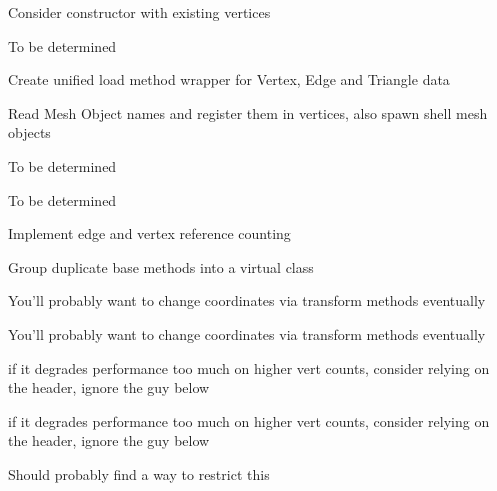 
\begin{DoxyRefList}
\item[\label{todo__todo000002}%
\hypertarget{todo__todo000002}{}%
Namespace \hyperlink{namespace_core}{Core} ]Consider constructor with existing vertices 

To be determined 

Create unified load method wrapper for Vertex, Edge and Triangle data 

Read Mesh Object names and register them in vertices, also spawn shell mesh objects 

\begin{DoxyVerb}\end{DoxyVerb}




To be determined 

To be determined 

Implement edge and vertex reference counting 

Group duplicate base methods into a virtual class 

You'll probably want to change coordinates via transform methods eventually 

You'll probably want to change coordinates via transform methods eventually  
\item[\label{todo__todo000006}%
\hypertarget{todo__todo000006}{}%
Member \hyperlink{class_core_1_1_i_o_1_1_model_file_abd7e3094112324e6998a71b4abf4abe7}{Core\+:\+:I\+O\+:\+:Model\+File\+:\+:Extract\+Edge\+Data} (int \&edge\+Count, std\+::vector$<$ Renderer\+::\+Core\+Utils\+::\+Vertex $\ast$ $>$ \&vertex\+Pool\+Ref)]if it degrades performance too much on higher vert counts, consider relying on the header, ignore the guy below  
\item[\label{todo__todo000005}%
\hypertarget{todo__todo000005}{}%
Member \hyperlink{class_core_1_1_i_o_1_1_model_file_a19f09e279bf01f806aa9d4435a845bd3}{Core\+:\+:I\+O\+:\+:Model\+File\+:\+:Extract\+Vertex\+Data} (int \&vert\+Count)]if it degrades performance too much on higher vert counts, consider relying on the header, ignore the guy below  
\item[\label{todo__todo000019}%
\hypertarget{todo__todo000019}{}%
Member \hyperlink{class_core_1_1_renderer_1_1_core_utils_1_1_vertex_ac8ac66bade652d222a0030d2fcd5fcdb}{Core\+:\+:Renderer\+:\+:Core\+Utils\+:\+:Vertex\+:\+:Vertex} ()]Should probably find a way to restrict this  
\item[\label{todo__todo000011}%
\hypertarget{todo__todo000011}{}%
Class \hyperlink{class_mesh_container}{Mesh\+Container} ]\begin{DoxyVerb}\end{DoxyVerb}




\end{DoxyRefList}

